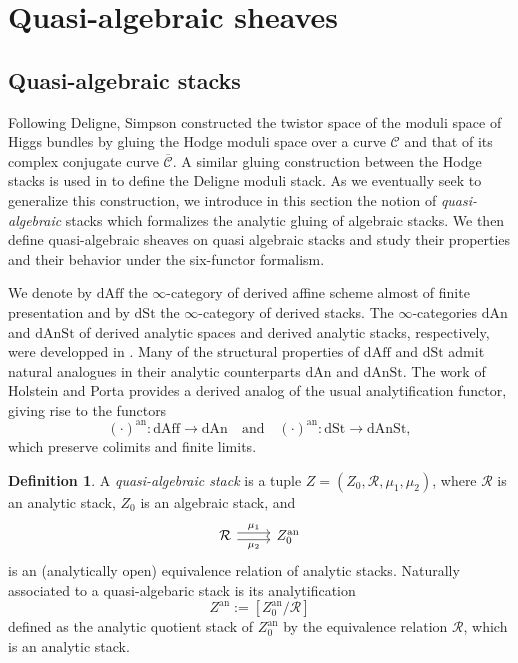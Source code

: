\documentclass[11pt, a4paper]{amsart}
\numberwithin{equation}{section}
\theoremstyle{definition}
\newtheorem{definition}[theorem]{Definition}
\theoremstyle{remark}
\DeclareMathOperator{\an}{an}
\newcommand{\Cc}{\mathcal{C}}
\newcommand{\Rr}{\mathcal{R}}
\newcommand{\ol}[1]{\overline{#1}}
\renewcommand{\to}{\longrightarrow}
\begin{document}
\section{Quasi-algebraic sheaves}
\label{sc qalg}

\subsection{Quasi-algebraic stacks} \label{subsect: gluingOnDeligneStack}

Following Deligne, Simpson constructed \cite{simpson_hodge_2} the twistor space of the moduli space of Higgs bundles by gluing the Hodge moduli space over a curve $\Cc$ and that of its complex conjugate curve $\ol{\Cc}$. A similar gluing construction between the Hodge stacks is used in \cite{franco&hanson} to define the Deligne moduli stack. As we eventually seek to generalize this construction, we introduce in this section the notion of {\it quasi-algebraic} stacks which formalizes the analytic gluing of algebraic stacks. We then define quasi-algebraic sheaves on quasi algebraic stacks and study their properties and their behavior under the six-functor formalism. 


We denote by $\mathrm{dAff}$ the $\infty$-category of derived affine scheme almost of finite presentation and by $\mathrm{dSt}$ the $\infty$-category of derived stacks. The $\infty$-categories $\mathrm{dAn}$ and $\mathrm{dAnSt}$ of derived analytic spaces and derived analytic stacks, respectively, were developped in \cite{porta_GAGA, lurie_11_c, porta&yue_dAn}. Many of the structural properties of $\mathrm{dAff}$ and $\mathrm{dSt}$ admit natural analogues in their analytic counterparts $\mathrm{dAn}$ and $\mathrm{dAnSt}$. The work of Holstein and Porta \cite[Section 3]{holstein&porta} provides a derived analog of the usual analytification functor, giving rise to the functors
\[
(\cdot)^{\an} : \mathrm{dAff} \to \mathrm{dAn} \quad \text{and} \quad (\cdot)^{\an} : \mathrm{dSt} \to \mathrm{dAnSt},
\]
which preserve colimits and finite limits. 


\begin{definition}
A {\it quasi-algebraic stack} is a tuple $Z = (Z_0, \Rr, \mu_1, \mu_2)$, where $\Rr$ is an analytic stack, $Z_0$ is an algebraic stack, and 
\[\begin{tikzcd}
	\Rr & {Z_0^{\mathrm{an}}}
	\arrow["{\mu_2}"', shift right, from=1-1, to=1-2]
	\arrow["{\mu_1}", shift left, from=1-1, to=1-2]
\end{tikzcd}
\]
is an (analytically open) equivalence relation of analytic stacks. Naturally associated to a quasi-algebaric stack is its analytification 
$$Z^{\mathrm{an}} := [Z_0^{\mathrm{an}}/\mathcal{R}]$$
defined as the analytic quotient stack of $Z_0^{\mathrm{an}}$ by the equivalence relation $\mathcal{R}$, which is an analytic stack.
\end{definition}
\end{document}
